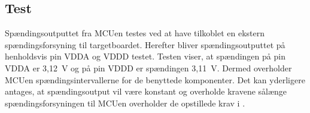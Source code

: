 \subsection{Test}
Spændingsoutputtet fra MCUen testes ved at have tilkoblet en ekstern spændingsforsyning til targetboardet. Herefter bliver spændingsoutputtet på henholdsvis pin VDDA og VDDD testet.  \newline
Testen viser, at spændingen på pin VDDA er 3,12~V og på pin VDDD er spændingen 3,11~V. Dermed overholder MCUen spændingsintervallerne for de benyttede komponenter. Det kan yderligere antages, at spændingsoutput vil være konstant og overholde kravene sålænge spændingsforsyningen til MCUen overholder de opstillede krav i .

